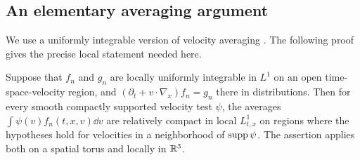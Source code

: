 \subsection{An elementary averaging argument}

We use a uniformly integrable version of velocity averaging
\cite[Proposition~3]{GolseLionsPerthameSentis1988}. The following proof gives
the precise local statement needed here.

\begin{lemma}\label{comp:averaging}
Suppose that \(f_n\) and \(g_n\) are locally uniformly integrable in
\(L^1\) on an open time-space-velocity region, and
\((\partial_t+v\cdot\nabla_x)f_n=g_n\) there in distributions.
Then for every smooth compactly supported velocity test \(\psi\), the
averages \(\int\psi(v)f_n(t,x,v)\dd v\) are relatively compact in
local \(L^1_{t,x}\) on regions where the hypotheses hold for velocities
in a neighborhood of \(\operatorname{supp}\psi\). The assertion applies both on a
spatial torus and locally in \(\mathbb R^3\).
\end{lemma}

